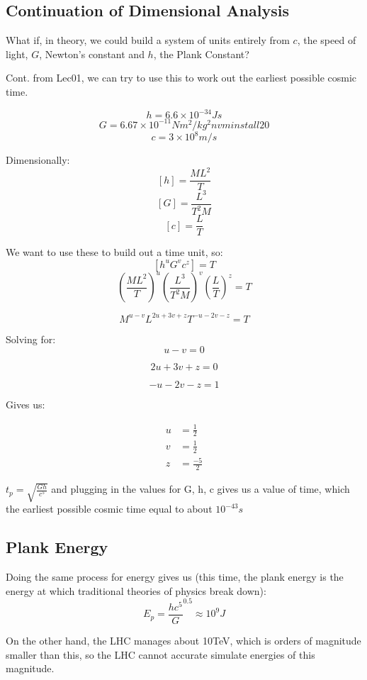\subsection{Continuation of Dimensional Analysis}
What if, in theory, we could build a system of units entirely from $c$, the speed of light, $G$, Newton's constant and $h$, the Plank Constant?

Cont. from Lec01, we can try to use this to work out the earliest possible cosmic time.

\[
    h = 6.6 \times 10^{-34}Js
\]
\[
    G = 6.67 \times 10^{-11} N m^2 / kg^2nvm install 20
\]
\[
    c = 3 \times 10^8 m/s
\]

Dimensionally:
\[
    [h] = \frac{ML^2}{T}
\]
\[
    [G] = \frac{L^3}{T^2 M}
\]
\[
    [c] = \frac{L}{T}
\]

We want to use these to build out a time unit, so:
\[
    [h^u G^v c^z] = T
\]
\[
    \left(\frac{ML^2}{T}\right)^u \left(\frac{L^3}{T^2 M}\right)^v \left(\frac{L}{T}\right)^z = T
\]

\[
    M^{u-v} L^{2u + 3v + z} T^{-u - 2v -z} = T
\]

Solving for:
\[
    u-v = 0
\]

\[
    2u+3v + z = 0
\]

\[
    -u - 2v - z = 1
\]

Gives us:

\begin{align}
    u &= \frac{1}{2}\\
    v &= \frac{1}{2}\\
    z &= \frac{-5}{2}
\end{align}

$t_p = \sqrt{\frac{Gh}{c^5}}$ and plugging in the values for G, h, c gives us a value of time, which the earliest possible cosmic time equal to about $10^{-43}s$


\subsection{Plank Energy}
Doing the same process for energy gives us (this time, the plank energy is the energy at which traditional theories of physics break down):
\[
    E_p = \frac{hc^5}{G}^{0.5} \approx 10^9 J
\]

On the other hand, the LHC manages about 10TeV, which is orders of magnitude smaller than this, so the LHC cannot accurate simulate energies of this magnitude.

